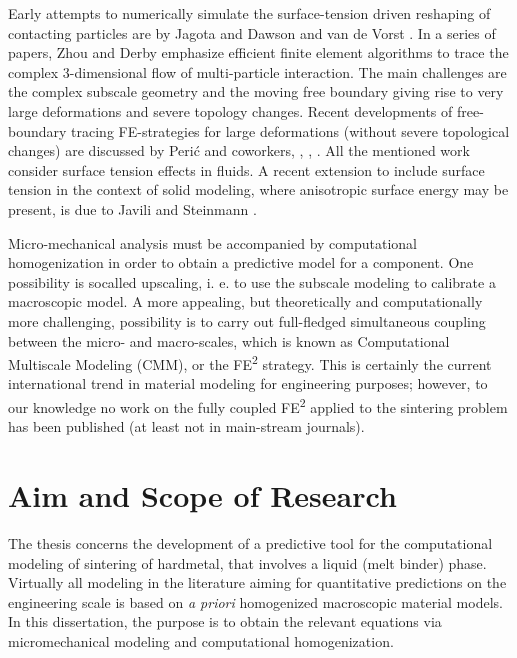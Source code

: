 \documentclass[MikaelDissertation.tex]{subfiles}
\begin{document}
Early attempts to numerically simulate the surface-tension driven reshaping of contacting particles are by Jagota and Dawson \cite{jagota_micromechanical_1988,jagota_micromechanical_1988-1} and van de Vorst \cite{van_de_vorst_integral_1993}.
In a series of papers, Zhou and Derby \cite{zhou_three-dimensional_1998,zhou_assessment_2001} emphasize efficient finite element algorithms to trace the complex 3-dimensional flow of multi-particle interaction.
The main challenges  are the complex subscale geometry and the moving free boundary giving rise to very large deformations and severe topology changes.
Recent developments of free-boundary tracing FE-strategies for large deformations (without severe topological changes) are discussed by Peri\'c and coworkers, \cite{dettmer_computational_2006}, \cite{saksono_finite_2006}, \cite{saksono_finite_2006-1}.
All the mentioned work consider surface tension effects in fluids.
A recent extension to include surface tension in the context of solid modeling, where anisotropic surface energy may be present, is due to Javili and Steinmann \cite{javili_finite_2010}.

Micro-mechanical analysis must be accompanied by computational homogenization in order to obtain a predictive model for a component.
One possibility is socalled upscaling, i. e. to use the subscale modeling to calibrate a macroscopic model.
A more appealing, but theoretically and computationally more challenging, possibility is to carry out full-fledged simultaneous coupling between the micro- and macro-scales, which is known as Computational Multiscale Modeling (CMM), or the FE\textsuperscript{2} strategy.
This is certainly the current international trend in material modeling for engineering purposes; however, to our knowledge no work on the fully coupled FE\textsuperscript{2} applied to the sintering problem has been published (at least not in main-stream journals).

\chapter{Aim and Scope of Research}

The thesis concerns the development of a predictive tool for the computational modeling of sintering of hardmetal, that involves a liquid (melt binder) phase.
Virtually all modeling in the literature aiming for quantitative predictions on the engineering scale is based on \emph{a priori} homogenized macroscopic material models.
In this dissertation, the purpose is to obtain the relevant equations via micromechanical modeling and computational homogenization.
\end{document}
